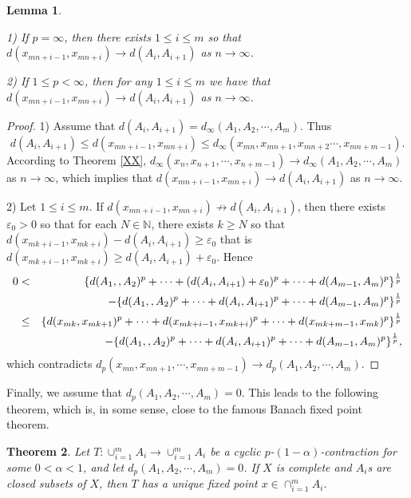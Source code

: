 \documentclass{amsart}
\newtheorem{theorem}{Theorem}[section]
\newtheorem{lemma}[theorem]{Lemma}
\theoremstyle{definition}
\theoremstyle{remark}
\begin{document}
\begin{lemma}\label{V1}${}$

1)  If $p=\infty$, then there exists $1\leq i\leq m$ so that $d(x_{mn+i-1},x_{mn+i})\to d(A_i,A_{i+1})$ as $n\to\infty$.

2) If $1\leq p<\infty$, then for any $1\leq i\leq m$ we have that $d(x_{mn+i-1},x_{mn+i})\to d(A_i,A_{i+1})$ as $n\to\infty$.
\end{lemma}
\begin{proof}
1)  Assume that $ d(A_i,A_{i+1})=d_\infty(A_1,A_2,\cdots,A_m)$. Thus
$$d(A_i,A_{i+1})\leq d(x_{mn+i-1},x_{mn+i})\leq d_\infty(x_{mn},x_{mn+1},x_{mn+2}\cdots,x_{mn+m-1}).$$ According to Theorem \ref{XX}, $d_\infty(x_n, x_{n+1},\cdots,x_{n+m-1})\to d_\infty(A_1,A_2,\cdots,A_m)$ as $n\to\infty$, which implies that $d(x_{mn+i-1},x_{mn+i})\to d(A_i,A_{i+1})$ as $n\to\infty$.

2) Let $1\leq i\leq m$. If $d(x_{mn+i-1},x_{mn+i})\not\to d(A_i,A_{i+1})$, then there exists $\varepsilon_0>0$ so that for each $N\in\mathbb{N}$, there exists $k\geq N$ so that $d(x_{mk+i-1},x_{mk+i})-d(A_i,A_{i+1})\geq\varepsilon_0$ that is $d(x_{mk+i-1},x_{mk+i})\geq d(A_i,A_{i+1})+\varepsilon_0$. Hence
\begin{eqnarray*}
0&<&\{d(A_1,,A_2)^p+\cdots+(d(A_{i},A_{i+1})+\varepsilon_0)^p+\cdots+d(A_{m-1},A_m)^p\}^{1\over p}\\&&-\{d(A_1,,A_2)^p+\cdots+d(A_{i},A_{i+1})^p+\cdots+d(A_{m-1},A_m)^p\}^{1\over p}\\
&\leq&\{d(x_{mk},x_{mk+1})^p+\cdots+d(x_{mk+i-1},x_{mk+i})^p+\cdots+d(x_{mk+m-1},x_{mk})^p\}^{1\over p}\\&&-\{d(A_1,,A_2)^p+\cdots+d(A_{i},A_{i+1})^p+\cdots+d(A_{m-1},A_m)^p\}^{1\over p},
\end{eqnarray*}
which contradicts $d_p(x_{mn}, x_{mn+1},\cdots,x_{mn+m-1})\to d_p(A_1,A_2,\cdots,A_m).$
\end{proof}
Finally, we assume that $d_p(A_1,A_2,\cdots,A_m)=0$. This leads to the following theorem, which is, in some sense, close to the famous Banach fixed point theorem.
\begin{theorem}\label{BANACH}
Let $T:\cup_{i=1}^mA_i\to\cup_{i=1}^mA_i$ be a cyclic $p$-$(1-\alpha)$-contraction for some $0<\alpha<1$, and let $d_p(A_1,A_2,\cdots,A_m)=0$. If $X$ is complete and $A_i$s are closed subsets of $X$, then $T$ has a unique fixed point $x\in\cap_{i=1}^mA_i$.
\end{theorem}
\end{document}
